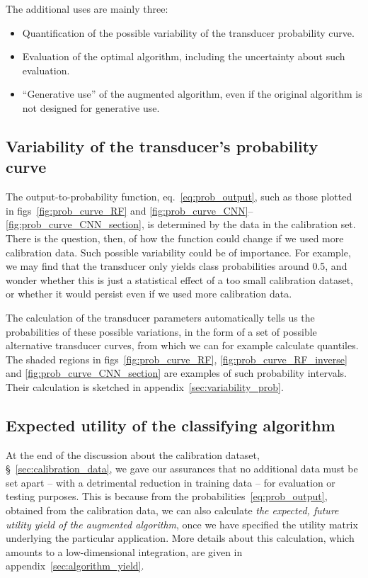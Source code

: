 \documentclass[\ifafour a4paper,12pt,\else a5paper,10pt,\fi%
onecolumn,oneside,article,%
british%
]{memoir}
\theoremstyle{remark}
\theoremstyle{innote}
\renewcommand*{\|}[1][]{\nonscript\:#1\vert\nonscript\:\mathopen{}}
\newcommand*{\sect}{\S}%
\newcommand*{\eqn}{eq.}%
\newcommand*{\figs}{figs}%
\begin{document}
The additional uses are mainly three:
\begin{itemize}
\item Quantification of the possible variability of the transducer probability curve.
\item Evaluation of the optimal algorithm, including the uncertainty about such evaluation.
\item \enquote{Generative use} of the augmented algorithm, even if the original algorithm is not designed for generative use.
\end{itemize}

\subsection{Variability of the transducer's probability curve}
\label{sec:variability_curve}

The output-to-probability function, \eqn~\eqref{eq:prob_output}, such as those plotted in \figs~\ref{fig:prob_curve_RF} and \ref{fig:prob_curve_CNN}--\ref{fig:prob_curve_CNN_section}, is determined by the data in the calibration set. There is the question, then, of how the function could change if we used more calibration data. Such possible variability could be of importance. For example, we may find that the transducer only yields class probabilities around 0.5, and wonder whether this is just a statistical effect of a too small calibration dataset, or whether it would persist even if we used more calibration data.

The calculation of the transducer parameters automatically tells us the probabilities of these possible variations, in the form of  a set of possible alternative transducer curves, from which we can for example calculate quantiles. The shaded regions in \figs~\ref{fig:prob_curve_RF}, \ref{fig:prob_curve_RF_inverse} and \ref{fig:prob_curve_CNN_section} are examples of such probability intervals. Their calculation is sketched in appendix~\ref{sec:variability_prob}.

\subsection{Expected utility of the classifying algorithm}
\label{sec:yield_of_classifier}

At the end of the discussion about the calibration dataset, \sect~\ref{sec:calibration_data}, we gave our assurances that no additional data must be set apart -- with a detrimental reduction in training data -- for evaluation or testing purposes. This is because from the probabilities~\eqref{eq:prob_output}, obtained from the calibration data, we can also calculate \emph{the expected, future utility yield of the augmented algorithm}, once we have specified the utility matrix underlying the particular application. More details about this calculation, which amounts to a low-dimensional integration, are given in appendix~\ref{sec:algorithm_yield}.
\end{document}
